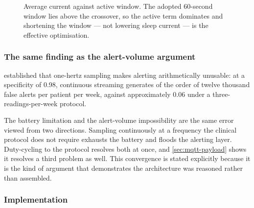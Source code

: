 \documentclass[12pt,a4paper,oneside]{report}
\begin{document}
\begin{figure}[htbp]
\centering
{}
\caption{Average current against active window. The adopted 60-second window lies above the crossover, so the active term dominates and shortening the window --- not lowering sleep current --- is the effective optimisation.}\label{fig:power}
\end{figure}

\subsubsection{The same finding as the alert-volume argument}

 established that one-hertz sampling makes alerting arithmetically unusable: at a specificity of 0.98, continuous streaming generates of the order of twelve thousand false alerts per patient per week, against approximately 0.06 under a three-readings-per-week protocol.

The battery limitation and the alert-volume impossibility are the same error viewed from two directions. Sampling continuously at a frequency the clinical protocol does not require exhausts the battery and floods the alerting layer. Duty-cycling to the protocol resolves both at once, and \cref{sec:mqtt-payload} shows it resolves a third problem as well. This convergence is stated explicitly because it is the kind of argument that demonstrates the architecture was reasoned rather than assembled.

\subsubsection{Implementation}
\end{document}
